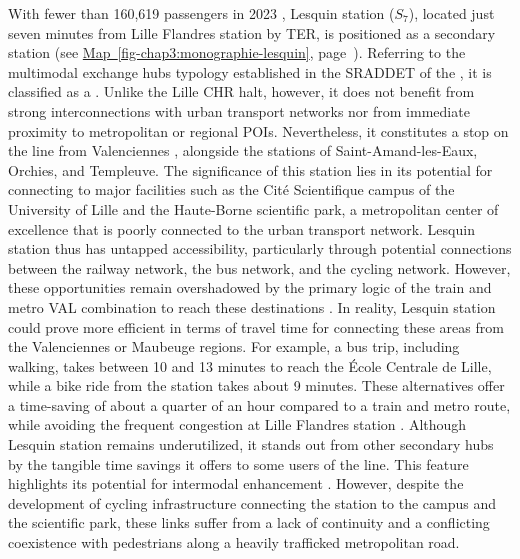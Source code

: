 \begin{refsegment}
With fewer than 160,619 passengers in 2023 \textcolor{blue}{\autocite{sncf_frequentation_2024}}, Lesquin station (\(S_7\)), located just seven minutes from Lille Flandres station by \acrshort{TER}, is positioned as a secondary station (see \hyperref[fig-chap3:monographie-lesquin]{Map~\ref{fig-chap3:monographie-lesquin}}, page~\pageref{fig-chap3:monographie-lesquin}). Referring to the multimodal exchange hubs typology established in the \acrshort{SRADDET} of the \textcolor{blue}{\textcite[83]{region_hauts-de-france_sraddet_2024}}, it is classified as a . Unlike the Lille CHR halt, however, it does not benefit from strong interconnections with urban transport networks nor from immediate proximity to metropolitan or regional \acrshort{POIs}. Nevertheless, it constitutes a stop on the  line from Valenciennes \textcolor{blue}{\autocite[38]{menerault_analyse_2000}}, alongside the stations of Saint-Amand-les-Eaux, Orchies, and Templeuve. The significance of this station lies in its potential for connecting to major facilities such as the Cité Scientifique campus of the University of Lille and the Haute-Borne scientific park, a metropolitan center of excellence that is poorly connected to the urban transport network. Lesquin station thus has untapped accessibility, particularly through potential connections between the railway network, the bus network, and the cycling network. However, these opportunities remain overshadowed by the primary logic of the train and metro \acrshort{VAL} combination to reach these destinations \textcolor{blue}{\autocite[18]{lhostis_definir_2010}}. In reality, Lesquin station could prove more efficient in terms of travel time for connecting these areas from the Valenciennes or Maubeuge regions. For example, a bus trip, including walking, takes between 10 and 13 minutes to reach the École Centrale de Lille, while a bike ride from the station takes about 9 minutes. These alternatives offer a time-saving of about a quarter of an hour compared to a train and metro route, while avoiding the frequent congestion at Lille Flandres station \textcolor{blue}{\autocites[58]{menerault_analyse_2000}[14]{lhostis_definir_2010}}. Although Lesquin station remains underutilized, it stands out from other secondary hubs by the tangible time savings it offers to some users of the line. This feature highlights its potential for intermodal enhancement \textcolor{blue}{\autocite[62]{menerault_analyse_2000}}. However, despite the development of cycling infrastructure connecting the station to the campus and the scientific park, these links suffer from a lack of continuity and a conflicting coexistence with pedestrians along a heavily trafficked metropolitan road.%


\end{refsegment}
